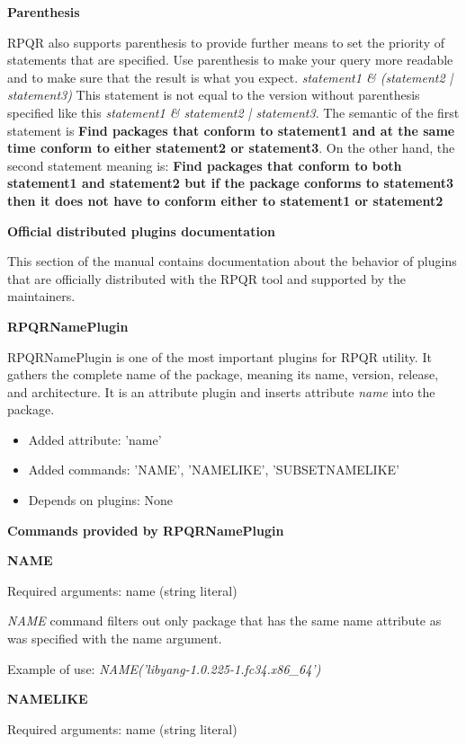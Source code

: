 \newpage

\textbf{Parenthesis}

RPQR also supports parenthesis to provide further means to set the priority of statements that are specified.
Use parenthesis to make your query more readable and to make sure that the result is what you expect.
\textit{statement1 \& (statement2 | statement3)} This statement is not equal to the version without
parenthesis specified like this \textit{statement1 \& statement2 | statement3}. The semantic of the first
statement is \textbf{Find packages that conform to statement1 and at the same time conform to either
statement2 or statement3}. On the other hand, the second statement meaning is: \textbf{Find packages
that conform to both statement1 and statement2 but if the package conforms to statement3 then it does not
have to conform either to statement1 or statement2}

\textbf{Official distributed plugins documentation}

This section of the manual contains documentation about the behavior of plugins that are officially
distributed with the RPQR tool and supported by the maintainers.

\textbf{RPQRNamePlugin}

RPQRNamePlugin is one of the most important plugins for RPQR utility. It gathers the complete name of the
package, meaning its name, version, release, and architecture. It is an attribute plugin and inserts
attribute \textit{name} into the package.

\begin{itemize}
  \item Added attribute: 'name'
  \item Added commands: 'NAME', 'NAMELIKE', 'SUBSETNAMELIKE'
  \item Depends on plugins: None
\end{itemize}

\textbf{Commands provided by RPQRNamePlugin}

\textbf{NAME}

Required arguments: name (string literal)

\textit{NAME} command filters out only package that has the same name attribute as was specified
with the name argument.

Example of use: \textit{NAME('libyang-1.0.225-1.fc34.x86\_64')}

\textbf{NAMELIKE}

Required arguments: name (string literal)

